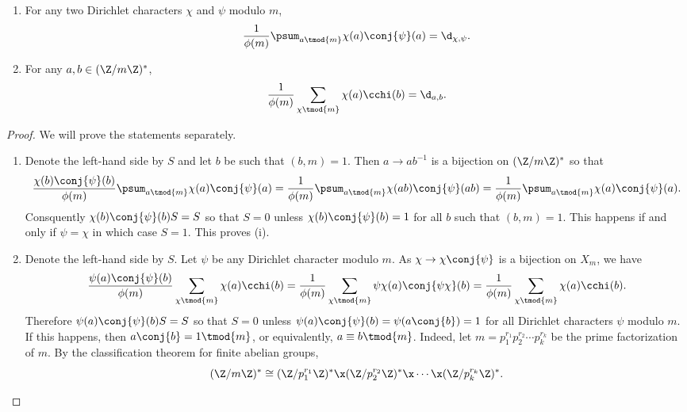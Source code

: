       \begin{proposition}\label{prop:Dirichlet_orthogonality_relations}
      \phantom{ }
        \begin{enumerate}[label=(\roman*)]
          \item For any two Dirichlet characters $\chi$ and $\psi$ modulo $m$,
          \[
            \frac{1}{\phi(m)}\psum_{a \tmod{m}}\chi(a)\conj{\psi}(a) = \d_{\chi,\psi}.
          \]
          \item For any $a,b \in (\Z/m\Z)^{\ast}$,
          \[
            \frac{1}{\phi(m)}\sum_{\chi \tmod{m}}\chi(a)\cchi(b) = \d_{a,b}.
          \]
        \end{enumerate}
      \end{proposition}
      \begin{proof}
        We will prove the statements separately.
        \begin{enumerate}[label=(\roman*)]
          \item Denote the left-hand side by $S$ and let $b$ be such that $(b,m) = 1$. Then $a \to ab^{-1}$ is a bijection on $(\Z/m\Z)^{\ast}$ so that
          \[
            \frac{\chi(b)\conj{\psi}(b)}{\phi(m)}\psum_{a \tmod{m}}\chi(a)\conj{\psi}(a) = \frac{1}{\phi(m)}\psum_{a \tmod{m}}\chi(ab)\conj{\psi}(ab) = \frac{1}{\phi(m)}\psum_{a \tmod{m}}\chi(a)\conj{\psi}(a).
          \]
          Consquently $\chi(b)\conj{\psi}(b)S = S$ so that $S = 0$ unless $\chi(b)\conj{\psi}(b) = 1$ for all $b$ such that $(b,m) = 1$. This happens if and only if $\psi = \chi$ in which case $S = 1$. This proves (i).
          \item Denote the left-hand side by $S$. Let $\psi$ be any Dirichlet character modulo $m$. As $\chi \to \chi\conj{\psi}$ is a bijection on $X_{m}$, we have
          \[
            \frac{\psi(a)\conj{\psi}(b)}{\phi(m)}\sum_{\chi \tmod{m}}\chi(a)\cchi(b) = \frac{1}{\phi(m)}\sum_{\chi \tmod{m}}\psi\chi(a)\conj{\psi\chi}(b) = \frac{1}{\phi(m)}\sum_{\chi \tmod{m}}\chi(a)\cchi(b).
          \]
          Therefore $\psi(a)\conj{\psi}(b)S = S$ so that $S = 0$ unless $\psi(a)\conj{\psi}(b) = \psi(a\conj{b}) = 1$ for all Dirichlet characters $\psi$ modulo $m$. If this happens, then $a\conj{b} = 1 \tmod{m}$, or equivalently, $a \equiv b \tmod{m}$. Indeed, let $m = p_{1}^{r_{1}}p_{2}^{r_{2}} \cdots p_{k}^{r_{k}}$ be the prime factorization of $m$. By the classification theorem for finite abelian groups,
          \[
            (\Z/m\Z)^{\ast} \cong (\Z/p_{1}^{r_{1}}\Z)^{\ast} \x (\Z/p_{2}^{r_{2}}\Z)^{\ast} \x \cdots \x (\Z/p_{k}^{r_{k}}\Z)^{\ast}.
\]
\end{enumerate}
\end{proof}
